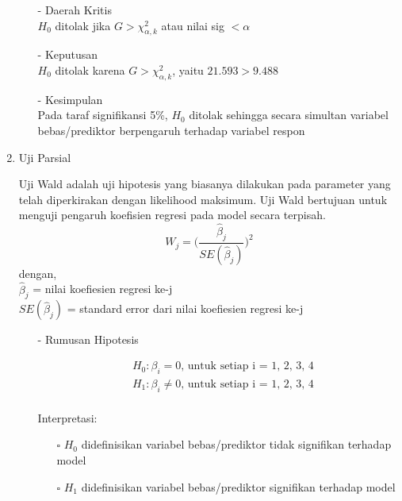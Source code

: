 \begin{enumerate}
\begin{test}
{\begin{enumerate}
        \item[-] Daerah Kritis \\
        $H_0$ ditolak jika $G > \chi_{\alpha, k}^2$ atau nilai sig $< \alpha$
    
        \item[-] Keputusan \\
        $H_0$ ditolak karena $G > \chi_{\alpha, k}^2$, yaitu $21.593 > 9.488$
    
        \item[-] Kesimpulan \\
        Pada taraf signifikansi 5\%, $H_0$ ditolak sehingga secara simultan variabel bebas/prediktor berpengaruh terhadap variabel respon
    \end{enumerate}
    }
    \end{test}
    
    \item Uji Parsial
    \begin{sloppypar}
        Uji Wald adalah uji hipotesis yang biasanya dilakukan pada parameter yang telah diperkirakan dengan likelihood maksimum. Uji Wald bertujuan untuk menguji pengaruh koefisien regresi pada model secara terpisah. $$W_j = \Bigg( \frac{\hat{\beta}_j}{SE(\hat{\beta}_j)} \Bigg)^2$$
        dengan, \\$\hat{\beta}_j$ = nilai koefiesien regresi ke-j \\$SE(\hat{\beta}_j)$ = standard error dari nilai koefiesien regresi ke-j
    \end{sloppypar}
    \begin{test}{
    \begin{enumerate}
        \item[-] Rumusan Hipotesis \\
        \begin{fleqn}[\parindent]
            \begin{equation*}
            \begin{split}
            &H_0 : \beta_i = 0 \text{, untuk setiap i = 1, 2, 3, 4} \\ 
            &H_1 : \beta_i \neq 0 \text{, untuk setiap i = 1, 2, 3, 4} \\
            \end{split}
            \end{equation*}
        \end{fleqn}
        Interpretasi:
        \begin{enumerate}
        \item[$\square$] $H_0$ didefinisikan variabel bebas/prediktor tidak signifikan terhadap model
        \item[$\square$] $H_1$ didefinisikan variabel bebas/prediktor signifikan terhadap model
        \end{enumerate}
    

\end{enumerate}}
\end{test}
\end{enumerate}
